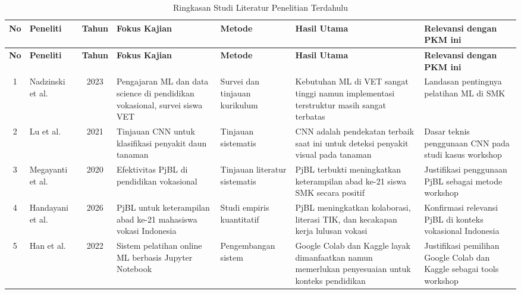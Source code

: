 \setlength{\tabcolsep}{3pt}
\small
\begin{longtable}{|c|p{1.8cm}|c|p{2.6cm}|p{1.9cm}|p{2.6cm}|p{2.4cm}|}
    \caption{Ringkasan Studi Literatur Penelitian Terdahulu}\label{tab:studi-literatur}\\
    \hline
    \textbf{No} & \textbf{Peneliti} & \textbf{Tahun} & \textbf{Fokus Kajian} & \textbf{Metode} & \textbf{Hasil Utama} & \textbf{Relevansi dengan PKM ini} \\
    \hline
    \endfirsthead

    \hline
    \textbf{No} & \textbf{Peneliti} & \textbf{Tahun} & \textbf{Fokus Kajian} & \textbf{Metode} & \textbf{Hasil Utama} & \textbf{Relevansi dengan PKM ini} \\
    \hline
    \endhead

    1 &
    Nadzinski et al.\ \cite{Nadzinski2023} &
    2023 &
    Pengajaran ML dan data science di pendidikan vokasional, survei siswa VET &
    Survei dan tinjauan kurikulum &
    Kebutuhan ML di VET sangat tinggi namun implementasi terstruktur masih sangat terbatas &
    Landasan pentingnya pelatihan ML di SMK \\ \hline

    2 &
    Lu et al.\ \cite{Lu2021} &
    2021 &
    Tinjauan CNN untuk klasifikasi penyakit daun tanaman &
    Tinjauan sistematis &
    CNN adalah pendekatan terbaik saat ini untuk deteksi penyakit visual pada tanaman &
    Dasar teknis penggunaan CNN pada studi kasus workshop \\ \hline

    3 &
    Megayanti et al.\ \cite{Derkach2020} &
    2020 &
    Efektivitas PjBL di pendidikan vokasional &
    Tinjauan literatur sistematis &
    PjBL terbukti meningkatkan keterampilan abad ke-21 siswa SMK secara positif &
    Justifikasi penggunaan PjBL sebagai metode workshop \\ \hline

    4 &
    Handayani et al.\ \cite{Handayani2026} &
    2026 &
    PjBL untuk keterampilan abad ke-21 mahasiswa vokasi Indonesia &
    Studi empiris kuantitatif &
    PjBL meningkatkan kolaborasi, literasi TIK, dan kecakapan kerja lulusan vokasi &
    Konfirmasi relevansi PjBL di konteks vokasional Indonesia \\ \hline

    5 &
    Han et al.\ \cite{Han2022} &
    2022 &
    Sistem pelatihan online ML berbasis Jupyter Notebook &
    Pengembangan sistem &
    Google Colab dan Kaggle layak dimanfaatkan namun memerlukan penyesuaian untuk konteks pendidikan &
    Justifikasi pemilihan Google Colab dan Kaggle sebagai tools workshop \\ \hline


\end{longtable}
